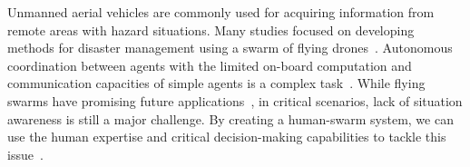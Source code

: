 \documentclass[runningheads]{llncs}%
\begin{document}
Unmanned aerial vehicles are commonly used for acquiring information from remote areas with hazard situations. Many studies focused on developing methods for disaster management using a swarm of flying drones~\cite{innocente2019self, gkotsis2019swarm, busnel2019self}. Autonomous coordination between agents with the limited on-board computation and communication capacities of simple agents is a complex task~\cite{chung2018survey}. While flying swarms have promising future applications~\cite{st2019planetary}, in critical scenarios, lack of situation awareness is still a major challenge. 
By creating a human-swarm system, we can use the human expertise and critical decision-making capabilities to tackle this issue~\cite{ALSaamas18,ramchurn2016disaster}. %
\end{document}
